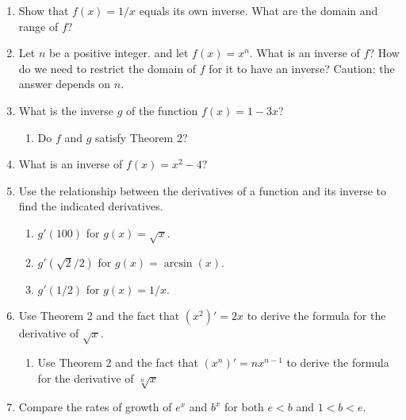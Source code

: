\begin{enumerate}
  \begin{enumerate}
  \item $f(x) = x^2$ (restricted to $x \geq 0$) and $g(x)=\sqrt{x}$.

  \item $f(x) = \sin(x)$ (restricted to $-\pi/2 \leq x \leq \pi/2\/$) and
$g(x) = \arcsin(x)$.


\end{enumerate}
\item Show that $f(x) = 1/x$ equals its own inverse.  What are the
domain and range of $f$?


\item Let $n$ be a positive integer. and let $f(x)=x^n$.  What is an
inverse of $f$?  How do we need to restrict the domain of $f$ for it
to have an inverse?  Caution: the answer depends on $n$.


\item What is the inverse $g$ of the function $f(x)=1-3x$?

  \begin{enumerate}
  \item Do
$f$ and $g$ satisfy Theorem 2?


\end{enumerate}
\item What is an inverse of $f(x) = x^2-4$?


\item Use the relationship between the derivatives of a function and
its inverse to find the indicated derivatives.

  \begin{enumerate}
  \item $g'(100)$ for $g(x)=\sqrt{x}$.

  \item $g'(\sqrt{2}/2)$ for $g(x)=\arcsin(x)$.

  \item $g'(1/2)$ for $g(x)=1/x$.


\end{enumerate}
\item Use Theorem 2 and the fact that $(x^2)'=2x$ to derive the
formula for the derivative of $\sqrt{x}$.

  \begin{enumerate}
  \item Use Theorem 2 and the fact that $(x^n)'=nx^{n-1}$ to derive the
formula for the derivative of $\sqrt[n]{x}$



\end{enumerate}
\item Compare the rates of growth of $e^x$ and $b^x$ for both $e < b$
and $1 < b < e$.


\end{enumerate}
